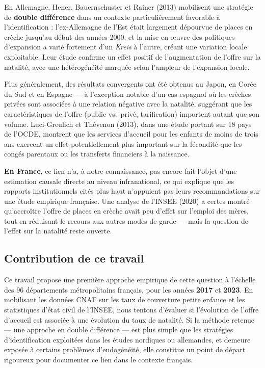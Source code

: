 \documentclass[
  letterpaper,
  DIV=11,
  numbers=noendperiod]{scrartcl}
\begin{document}
En Allemagne, Hener, Bauernschuster et Rainer (2013) mobilisent une
stratégie de \textbf{double différence} dans un contexte
particulièrement favorable à l'identification : l'ex-Allemagne de l'Est
était largement dépourvue de places en crèche jusqu'au début des années
2000, et la mise en œuvre des politiques d'expansion a varié fortement
d'un \emph{Kreis} à l'autre, créant une variation locale exploitable.
Leur étude confirme un effet positif de l'augmentation de l'offre sur la
natalité, avec une hétérogénéité marquée selon l'ampleur de l'expansion
locale.

Plus généralement, des résultats convergents ont été obtenus au Japon,
en Corée du Sud et en Espagne --- à l'exception notable d'un cas
espagnol où les crèches privées sont associées à une relation négative
avec la natalité, suggérant que les caractéristiques de l'offre (public
vs.~privé, tarification) importent autant que son volume. Luci-Greulich
et Thévenon (2013), dans une étude portant sur 18 pays de l'OCDE,
montrent que les services d'accueil pour les enfants de moins de trois
ans exercent un effet potentiellement plus important sur la fécondité
que les congés parentaux ou les transferts financiers à la naissance.

\textbf{En France}, ce lien n'a, à notre connaissance, pas encore fait
l'objet d'une estimation causale directe au niveau infranational, ce qui
explique que les rapports institutionnels cités plus haut n'appuient pas
leurs recommandations sur une étude empirique française. Une analyse de
l'INSEE (2020) a certes montré qu'accroître l'offre de places en crèche
avait peu d'effet sur l'emploi des mères, tout en réduisant le recours
aux autres modes de garde --- mais la question de l'effet sur la
natalité reste ouverte.

\subsection{Contribution de ce
travail}\label{contribution-de-ce-travail}

Ce travail propose une première approche empirique de cette question à
l'échelle des 96 départements métropolitains français, pour les années
\textbf{2017} et \textbf{2023}. En mobilisant les données CNAF sur les
taux de couverture petite enfance et les statistiques d'état civil de
l'INSEE, nous tentons d'évaluer si l'évolution de l'offre d'accueil est
associée à une évolution du taux de natalité. Si la méthode retenue ---
une approche en double différence --- est plus simple que les stratégies
d'identification exploitées dans les études nordiques ou allemandes, et
demeure exposée à certains problèmes d'endogénéité, elle constitue un
point de départ rigoureux pour documenter ce lien dans le contexte
français.
\end{document}
